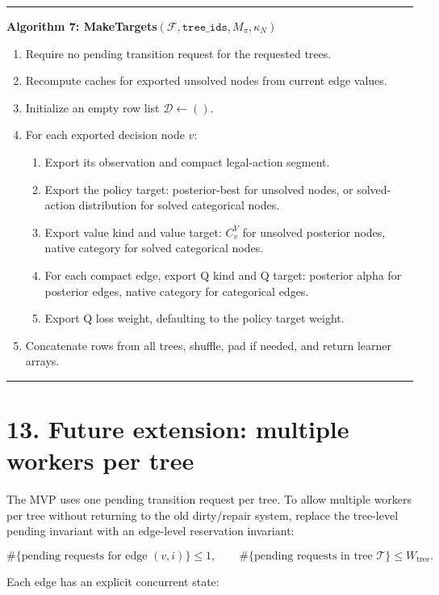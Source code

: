 \documentclass[11pt]{article}
\newcommand{\Forest}{\mathcal{F}}
\newcommand{\Tree}{\mathcal{T}}
\newenvironment{algorithmblock}[1]
{
  \par\medskip
  \noindent\hrule\par\smallskip
  \noindent\textbf{#1}
  \par\smallskip
}
{
  \par\smallskip\noindent\hrule\par\medskip
}
\begin{document}
\begin{algorithmblock}{Algorithm 7: MakeTargets\((\Forest,\texttt{tree\_ids},M_\pi,\kappa_N)\)}

\begin{enumerate}[leftmargin=2em]
  \item Require no pending transition request for the requested trees.
  \item Recompute caches for exported unsolved nodes from current edge values.
  \item Initialize an empty row list \(\mathcal{D}\gets()\).
  \item For each exported decision node \(v\):
  \begin{enumerate}[leftmargin=2em]
    \item Export its observation and compact legal-action segment.
    \item Export the policy target: posterior-best for unsolved nodes, or
    solved-action distribution for solved categorical nodes.
    \item Export value kind and value target: \(C^V_v\) for unsolved posterior
    nodes, native category for solved categorical nodes.
    \item For each compact edge, export Q kind and Q target: posterior alpha for
    posterior edges, native category for categorical edges.
    \item Export Q loss weight, defaulting to the policy target weight.
  \end{enumerate}
  \item Concatenate rows from all trees, shuffle, pad if needed, and return
  learner arrays.
\end{enumerate}

\end{algorithmblock}

\section*{13. Future extension: multiple workers per tree}

The MVP uses one pending transition request per tree. To allow multiple workers
per tree without returning to the old dirty/repair system, replace the tree-level
pending invariant with an edge-level reservation invariant:

\[
\#\{\text{pending requests for edge }(v,i)\}\le 1,
\qquad
\#\{\text{pending requests in tree }\Tree\}\le W_{\mathrm{tree}}.
\]

Each edge has an explicit concurrent state:
\end{document}

